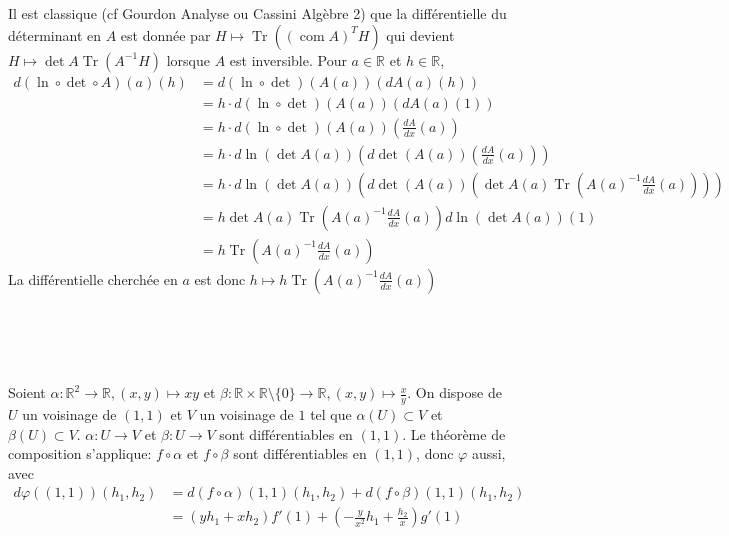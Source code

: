 \documentclass{report}
\DeclareMathOperator{\Tr}{Tr}
\begin{document}
\subsection{} \noindent{}\\ 
\\ 
\\
\noindent Il est classique (cf Gourdon Analyse ou Cassini Algèbre 2) que la différentielle du déterminant en $A$ est donnée par $H\mapsto \Tr((\operatorname{com} A)^TH)$ qui devient $H\mapsto \det A \Tr(A^{-1}H)$ lorsque $A$ est inversible.\newline 
Pour $a\in \mathbb R$ et $h\in \mathbb R$, $$\begin{aligned} 
d(\ln \circ \det \circ A)(a)(h) &= d(\ln \circ \det)(A(a))(dA(a)(h))\\
&= h \cdot d(\ln \circ \det)(A(a))(dA(a)(1)) \\
&= h \cdot d(\ln \circ \det)(A(a))( \frac{dA}{dx}(a) ) \\
&= h \cdot d\ln (\det A(a))\left( d\det (A(a))(\frac{dA}{dx}(a)) \right) \\
&= h \cdot d\ln (\det A(a))\left( d\det (A(a))\left ( \det A(a) \Tr\left (A(a)^{-1}\frac{dA}{dx}(a)\right) \right)  \right)\\
&= h \det A(a) \Tr\left (A(a)^{-1}\frac{dA}{dx}(a)\right) d\ln (\det A(a))(1) \\
&= h \Tr\left (A(a)^{-1}\frac{dA}{dx}(a)\right)
\end{aligned}$$
La différentielle cherchée en $a$ est donc $h\mapsto h \Tr\left (A(a)^{-1}\frac{dA}{dx}(a)\right)$

\subsection{} \noindent{}\\ 
\\ 
\\
\noindent Soient $\alpha:\mathbb R^2\to \mathbb R, (x,y)\mapsto xy$ et $\beta:\mathbb R\times \mathbb R\setminus\{0\} \to \mathbb R, (x,y)\mapsto \frac{x}{y}$.\newline
On dispose de $U$ un voisinage de $(1,1)$ et $V$ un voisinage de $1$ tel que $\alpha(U)\subset V$ et $\beta(U)\subset V$. $\alpha:U\to V$ et $\beta:U \to V$ sont différentiables en $(1,1)$.\newline 
 Le théorème de composition s'applique: $f\circ \alpha$ et $f\circ \beta$ sont différentiables en $(1,1)$, donc $\varphi$ aussi, avec 
 $$\begin{aligned} d\varphi((1,1))(h_1,h_2) &= d(f\circ \alpha)(1,1)(h_1,h_2)+d(f\circ \beta)(1,1)(h_1,h_2)\\
 &= (yh_1+xh_2)f'(1) + (-\frac{y}{x^2}h_1+\frac{h_2}{x})g'(1)
 \end{aligned}$$
\end{document}
